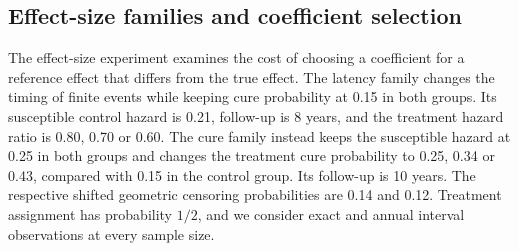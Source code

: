 \documentclass[12pt]{article}
\theoremstyle{definition}
\theoremstyle{remark}
\begin{document}
\subsection{Effect-size families and coefficient selection}
\label{sec:frequency-effects}
The effect-size experiment examines the cost of choosing a coefficient for a reference effect that differs from the true effect. The latency family changes the timing of finite events while keeping cure probability at 0.15 in both groups. Its susceptible control hazard is 0.21, follow-up is 8 years, and the treatment hazard ratio is 0.80, 0.70 or 0.60. The cure family instead keeps the susceptible hazard at 0.25 in both groups and changes the treatment cure probability to 0.25, 0.34 or 0.43, compared with 0.15 in the control group. Its follow-up is 10 years. The respective shifted geometric censoring probabilities are 0.14 and 0.12. Treatment assignment has probability $1/2$, and we consider exact and annual interval observations at every sample size.
\end{document}
